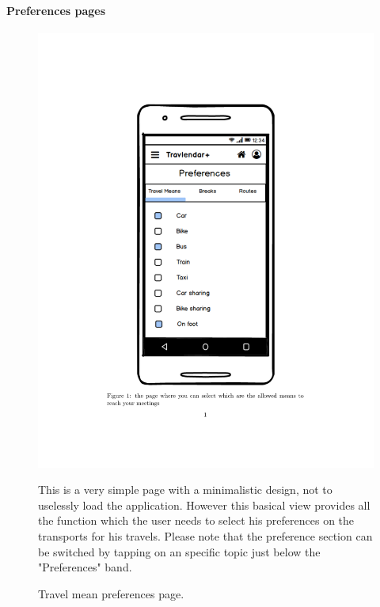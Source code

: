 \paragraph{Preferences pages}
	\begin{figure}
		\centering
		\includegraphics[width=0.6\linewidth]{mockups/PreferencesTravelMeans}
		\caption{Travel mean preferences page.}
		\label{fig:preferencestravelmeans}
			\begin{center}
			This is a very simple page with a minimalistic design, not to uselessly load the application. However this basical view provides all the function which the user needs to select his preferences on the transports for his travels. 
			Please note that the preference section can be switched by tapping on an specific topic just below the "Preferences" band.
			\end{center}
	\end{figure}

